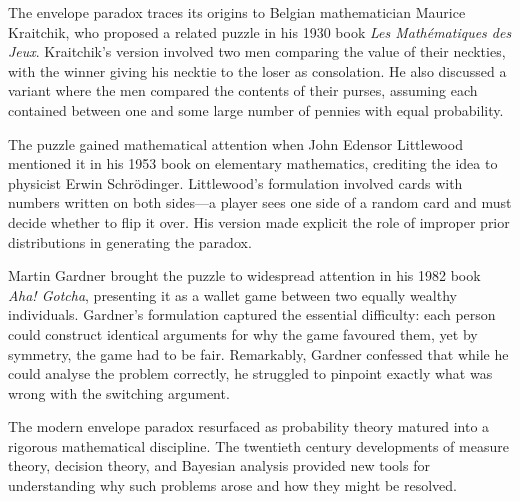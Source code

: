 \begin{historical}
The envelope paradox traces its origins to Belgian mathematician Maurice Kraitchik, who proposed a related puzzle in his 1930 book \textit{Les Mathématiques des Jeux}. Kraitchik's version involved two men comparing the value of their neckties, with the winner giving his necktie to the loser as consolation. He also discussed a variant where the men compared the contents of their purses, assuming each contained between one and some large number of pennies with equal probability.

The puzzle gained mathematical attention when John Edensor Littlewood mentioned it in his 1953 book on elementary mathematics, crediting the idea to physicist Erwin Schrödinger. Littlewood's formulation involved cards with numbers written on both sides—a player sees one side of a random card and must decide whether to flip it over. His version made explicit the role of improper prior distributions in generating the paradox.

Martin Gardner brought the puzzle to widespread attention in his 1982 book \textit{Aha! Gotcha}, presenting it as a wallet game between two equally wealthy individuals. Gardner's formulation captured the essential difficulty: each person could construct identical arguments for why the game favoured them, yet by symmetry, the game had to be fair. Remarkably, Gardner confessed that while he could analyse the problem correctly, he struggled to pinpoint exactly what was wrong with the switching argument.

The modern envelope paradox resurfaced as probability theory matured into a rigorous mathematical discipline. The twentieth century developments of measure theory, decision theory, and Bayesian analysis provided new tools for understanding why such problems arose and how they might be resolved. 
\end{historical}
